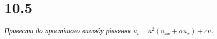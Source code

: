 


%


\section[Задача №10.5]{10.5}

\textit{Привести до простішого вигляду рівняння $u_t = a^2(u_{xx} + \alpha u_x) + cu$.}


%